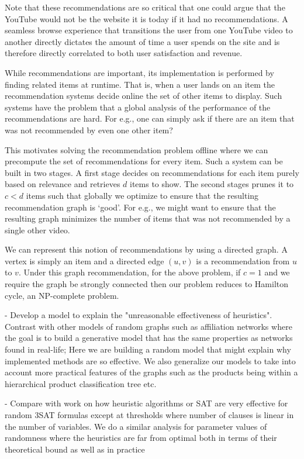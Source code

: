 Note that these recommendations are so critical that one could argue that the
YouTube would not be the website it is today if it had no recommendations. A
seamless browse experience that transitions the user from one YouTube video to
another directly dictates the amount of time a user spends on the site and is
therefore directly correlated to both user satisfaction and revenue. \vs

While recommendations are important, its implementation is performed by finding
related items at runtime. That is, when a user lands on an item the
recommendation systems decide online the set of other items to display. Such
systems have the problem that a global analysis of the performance of the
recommendations are hard. For e.g., one can simply ask if there are an item that
was not recommended by even one other item? \vs

This motivates solving the recommendation problem offline where we can
precompute the set of recommendations for every item. Such a system can be built
in two stages. A first stage decides on recommendations for each item purely
based on relevance and retrieves $d$ items to show. The second stages prunes it
to $c < d$ items such that globally we optimize to ensure that the resulting
recommendation graph is `good'. For e.g., we might want to ensure that the
resulting graph minimizes the number of items that was not recommended by a
single other video. \vs

We can represent this notion of recommendations by using a directed graph. A
vertex is simply an item and a directed edge $(u, v)$ is a recommendation from
$u$ to $v$. Under this graph recommendation, for the above problem, if $c=1$ and
we require the graph be strongly connected then our problem reduces to Hamilton
cycle, an NP-complete problem. \vs


- Develop a model to explain the "unreasonable effectiveness of heuristics". Contrast with other models of random graphs such as affiliation networks where the goal is to build a generative model that has the same properties as networks found in real-life; Here we are building a random model that might explain why implemented methods are so effective. We also generalize our models to take into account more practical features of the graphs such as the products being within a hierarchical product classification tree etc.

- Compare with work on how heuristic algorithms or SAT are very effective for random 3SAT formulas except at thresholds where number of clauses is linear in the number of variables. We do a similar analysis for parameter values of randomness where the heuristics are far from optimal both in terms of their theoretical bound as well as in practice

